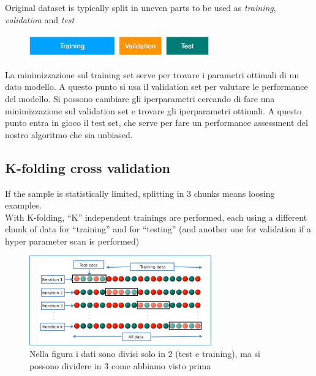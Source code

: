 Original dataset is typically split in uneven parts to be used as \textit{training}, \textit{validation} and \textit{test}

\begin{figure}[ht]
	\centering
	\includegraphics[width=0.7\textwidth]{figure_ml/hyperparams_optimization.png}
\end{figure}
\FloatBarrier

\begin{tcolorbox}[width=\textwidth,colback={white},title={\textbf{21.} What is hyper-parameter optimization and why would it require additional splitting of the available dataset?
		
		
	},colbacktitle=red,coltitle=black]
La minimizzazione sul training set serve per trovare i parametri ottimali di un dato modello.
A questo punto si usa il validation set per valutare le performance del modello. Si possono cambiare gli iperparametri cercando di fare una minimizzazione sul validation set e trovare gli iperparametri ottimali. A questo punto entra in gioco il test set, che serve per fare un performance assessment del nostro algoritmo che sia unbiased.
	
	
\end{tcolorbox}

\subsection{K-folding cross validation}

If the sample is statistically limited, splitting in 3 chunks means loosing
examples.\\
With K-folding, “K” independent trainings are performed, each using a
different chunk of data for “training” and for “testing” (and another one for
validation if a hyper parameter scan is performed)

\begin{figure}[ht]
	\centering
	\includegraphics[width=0.7\textwidth]{figure_ml/k-folding.png}
	\caption{Nella figura i dati sono divisi solo in 2 (test e training), ma si possono dividere in 3 come abbiamo visto prima}
\end{figure}
\FloatBarrier

